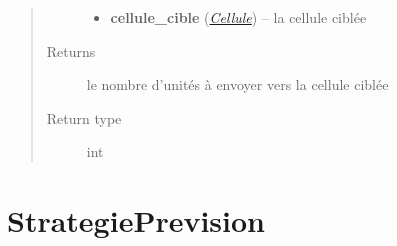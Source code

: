\documentclass[letterpaper,10pt,english]{sphinxmanual}
\begin{document}
\begin{fulllineitems}
\begin{fulllineitems}
\begin{quote}
\begin{description}
\begin{itemize}
\item {} 
\textbf{cellule\_cible} ({\hyperref[index:module-Cellule]{\emph{Cellule}}}) -- la cellule ciblée

\end{itemize}

\item[{Returns}] \leavevmode
le nombre d'unités à envoyer vers la cellule ciblée

\item[{Return type}] \leavevmode
int

\end{description}\end{quote}

\end{fulllineitems}


\end{fulllineitems}



\chapter{StrategiePrevision}
\label{index:module-StrategiePrevision}\label{index:strategieprevision}
\end{document}
